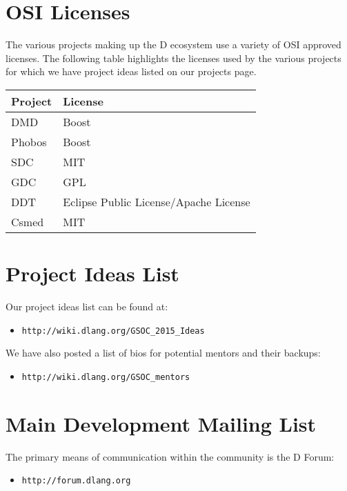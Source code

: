 \documentclass[	DIV=calc,%
							paper=a4,%
							fontsize=11pt,%
							twocolumn]{scrartcl}	 					%
\begin{document}
\section{OSI Licenses}

The various projects making up the D ecosystem use a variety of OSI approved
licenses.  The following table highlights the licenses used by the various projects
for which we have project ideas listed on our projects page.

\begin{center}
   \begin{tabular}{ | l | l | }
     \hline
     \textbf{Project} & \textbf{License} \\ \hline
     DMD & Boost \\
     Phobos & Boost \\
     SDC & MIT \\
     GDC & GPL \\
     DDT & Eclipse Public License/Apache License  \\
     Csmed & MIT \\ \hline
   \end{tabular}
\end{center}


\section{Project Ideas List}

Our project ideas list can be found at:
\begin{itemize}
\item \texttt{http://wiki.dlang.org/GSOC\_2015\_Ideas}
\end{itemize}

\noindent We have also posted a list of bios for potential mentors and their
backups:
\begin{itemize}
\item \texttt{http://wiki.dlang.org/GSOC\_mentors}
\end{itemize}

\section{Main Development Mailing List}
The primary means of communication within the community is
the D Forum:
\begin{itemize}
\item \texttt{http://forum.dlang.org}
\end{itemize}
\end{document}
